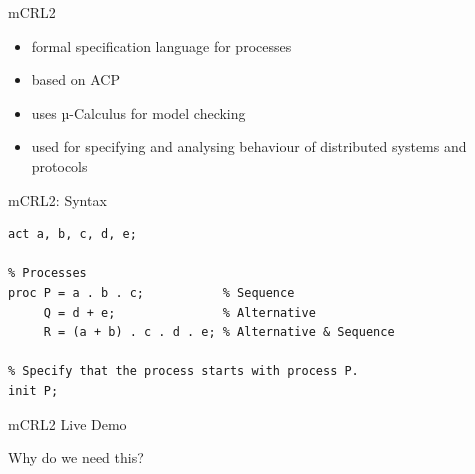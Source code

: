 \documentclass[aspectratio=1610]{beamer}
\begin{document}
  \begin{frame}{mCRL2}
    \begin{itemize}
      \item formal specification language for processes
      \item based on ACP
      \item uses µ-Calculus for model checking
      \item used for specifying and analysing behaviour of distributed systems and protocols
    \end{itemize}
  \end{frame}

  \begin{frame}[fragile]{mCRL2: Syntax}
    \begin{lstlisting}[language=mCRL2]
% Actions
act a, b, c, d, e;

% Processes
proc P = a . b . c;           % Sequence
     Q = d + e;               % Alternative
     R = (a + b) . c . d . e; % Alternative & Sequence

% Specify that the process starts with process P.
init P;
    \end{lstlisting}
  \end{frame}

  \begin{frame}[standout]
    mCRL2 Live Demo
  \end{frame}

  \begin{frame}[standout]
    Why do we need this?
  \end{frame}
\end{document}
